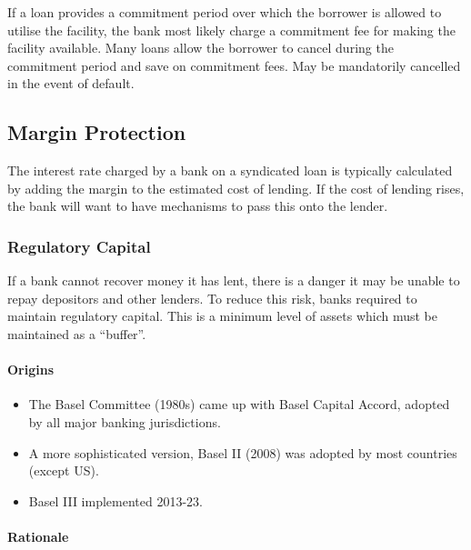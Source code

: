 \documentclass[
]{article}
\providecommand{\tightlist}{%
  \setlength{\itemsep}{0pt}\setlength{\parskip}{0pt}}
\begin{document}
If a loan provides a commitment period over which the borrower is
allowed to utilise the facility, the bank most likely charge a
commitment fee for making the facility available. Many loans allow the
borrower to cancel during the commitment period and save on commitment
fees. May be mandatorily cancelled in the event of default.

\hypertarget{margin-protection}{%
\subsection{Margin Protection}\label{margin-protection}}

The interest rate charged by a bank on a syndicated loan is typically
calculated by adding the margin to the estimated cost of lending. If the
cost of lending rises, the bank will want to have mechanisms to pass
this onto the lender.

\hypertarget{regulatory-capital}{%
\subsubsection{Regulatory Capital}\label{regulatory-capital}}

If a bank cannot recover money it has lent, there is a danger it may be
unable to repay depositors and other lenders. To reduce this risk, banks
required to maintain regulatory capital. This is a minimum level of
assets which must be maintained as a ``buffer''.

\hypertarget{origins}{%
\paragraph{Origins}\label{origins}}

\begin{itemize}
\tightlist
\item
  The Basel Committee (1980s) came up with Basel Capital Accord, adopted
  by all major banking jurisdictions.
\item
  A more sophisticated version, Basel II (2008) was adopted by most
  countries (except US).
\item
  Basel III implemented 2013-23.
\end{itemize}

\hypertarget{rationale}{%
\paragraph{Rationale}\label{rationale}}
\end{document}
